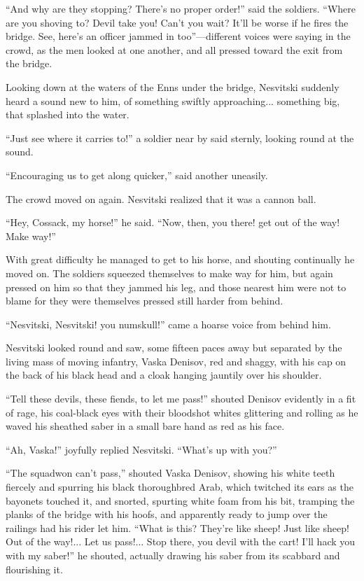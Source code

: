 ``And why are they stopping? There's no proper order!'' said the
soldiers.  ``Where are you shoving to? Devil take you! Can't you
wait? It'll be worse if he fires the bridge. See, here's an
officer jammed in too''---different voices were saying in the
crowd, as the men looked at one another, and all pressed toward
the exit from the bridge.

Looking down at the waters of the Enns under the bridge,
Nesvitski suddenly heard a sound new to him, of something swiftly
approaching...  something big, that splashed into the water.

``Just see where it carries to!'' a soldier near by said sternly,
looking round at the sound.

``Encouraging us to get along quicker,'' said another uneasily.

The crowd moved on again. Nesvitski realized that it was a cannon
ball.

``Hey, Cossack, my horse!'' he said. ``Now, then, you there! get
out of the way! Make way!''

With great difficulty he managed to get to his horse, and
shouting continually he moved on. The soldiers squeezed
themselves to make way for him, but again pressed on him so that
they jammed his leg, and those nearest him were not to blame for
they were themselves pressed still harder from behind.

``Nesvitski, Nesvitski! you numskull!'' came a hoarse voice from
behind him.

Nesvitski looked round and saw, some fifteen paces away but
separated by the living mass of moving infantry, Vaska Denisov,
red and shaggy, with his cap on the back of his black head and a
cloak hanging jauntily over his shoulder.

``Tell these devils, these fiends, to let me pass!'' shouted
Denisov evidently in a fit of rage, his coal-black eyes with
their bloodshot whites glittering and rolling as he waved his
sheathed saber in a small bare hand as red as his face.

``Ah, Vaska!'' joyfully replied Nesvitski. ``What's up with
you?''

``The squadwon can't pass,'' shouted Vaska Denisov, showing his
white teeth fiercely and spurring his black thoroughbred Arab,
which twitched its ears as the bayonets touched it, and snorted,
spurting white foam from his bit, tramping the planks of the
bridge with his hoofs, and apparently ready to jump over the
railings had his rider let him. ``What is this? They're like
sheep! Just like sheep! Out of the way!... Let us pass!... Stop
there, you devil with the cart! I'll hack you with my saber!'' he
shouted, actually drawing his saber from its scabbard and
flourishing it.

